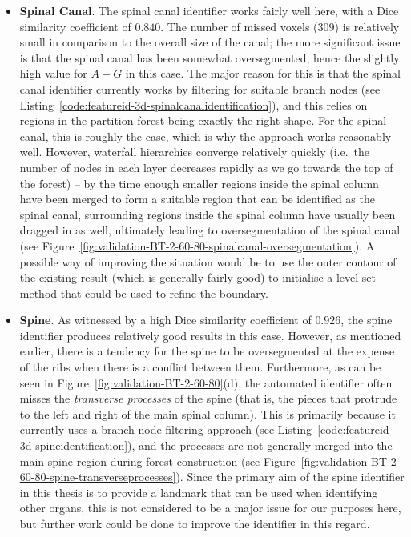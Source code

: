 \begin{itemize}
\item \textbf{Spinal Canal}. The spinal canal identifier works fairly well here, with a Dice similarity coefficient of $0.840$. The number of missed voxels ($309$) is relatively small in comparison to the overall size of the canal; the more significant issue is that the spinal canal has been somewhat oversegmented, hence the slightly high value for $A - G$ in this case. The major reason for this is that the spinal canal identifier currently works by filtering for suitable branch nodes (see Listing~\ref{code:featureid-3d-spinalcanalidentification}), and this relies on regions in the partition forest being exactly the right shape. For the spinal canal, this is roughly the case, which is why the approach works reasonably well. However, waterfall hierarchies converge relatively quickly (i.e.~the number of nodes in each layer decreases rapidly as we go towards the top of the forest) -- by the time enough smaller regions inside the spinal column have been merged to form a suitable region that can be identified as the spinal canal, surrounding regions inside the spinal column have usually been dragged in as well, ultimately leading to oversegmentation of the spinal canal (see Figure~\ref{fig:validation-BT-2-60-80-spinalcanal-oversegmentation}). A possible way of improving the situation would be to use the outer contour of the existing result (which is generally fairly good) to initialise a level set method that could be used to refine the boundary.

\item \textbf{Spine}. As witnessed by a high Dice similarity coefficient of $0.926$, the spine identifier produces relatively good results in this case. However, as mentioned earlier, there is a tendency for the spine to be oversegmented at the expense of the ribs when there is a conflict between them. Furthermore, as can be seen in Figure~\ref{fig:validation-BT-2-60-80}(d), the automated identifier often misses the \emph{transverse processes} of the spine (that is, the pieces that protrude to the left and right of the main spinal column). This is primarily because it currently uses a branch node filtering approach (see Listing~\ref{code:featureid-3d-spineidentification}), and the processes are not generally merged into the main spine region during forest construction (see Figure~\ref{fig:validation-BT-2-60-80-spine-transverseprocesses}). Since the primary aim of the spine identifier in this thesis is to provide a landmark that can be used when identifying other organs, this is not considered to be a major issue for our purposes here, but further work could be done to improve the identifier in this regard.


\end{itemize}

